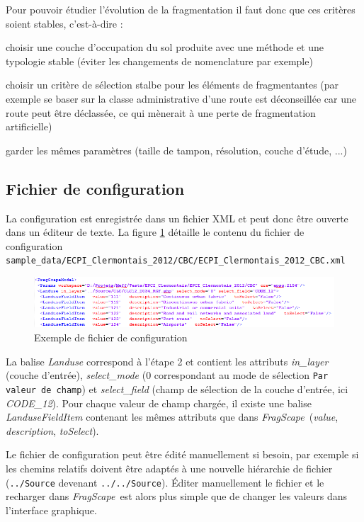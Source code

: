 \documentclass[11pt]{article}
\newcommand{\source}[1]{\vspace*{-0.4cm}\caption*{\textit{Source: {#1}}}}
\newcommand{\tool}{\emph{FragScape}}
\let\tempone\itemize
\let\temptwo\enditemize
\renewenvironment{itemize}{\tempone\addtolength{\itemsep}{-0.5\baselineskip}}{\temptwo}
\begin{document}
Pour pouvoir étudier l'évolution de la fragmentation il faut donc que ces critères soient stables, c'est-à-dire :
\begin{itemize}
    \item choisir une couche d'occupation du sol produite avec une méthode et une typologie stable (éviter les changements de nomenclature par exemple)
    \item choisir un critère de sélection stalbe pour les éléments de fragmentantes (par exemple se baser sur la classe administrative d'une route est déconseillée car une route peut être déclassée, ce qui mènerait à une perte de fragmentation artificielle)
    \item garder les mêmes paramètres (taille de tampon, résolution, couche d'étude, ...)
\end{itemize}

\subsection{Fichier de configuration}

La configuration est enregistrée dans un fichier XML et peut donc être ouverte dans un éditeur de texte. La figure \ref{fig:configFile} détaille le contenu du fichier de configuration \texttt{sample\_data/ECPI\_Clermontais\_2012/CBC/ECPI\_Clermontais\_2012\_CBC.xml}

\begin{figure}[h!]
    \centering
    \includegraphics[scale=0.8]{pictures/configFile.png}
    \caption{Exemple de fichier de configuration}
    \label{fig:configFile}
\end{figure}

La balise \textit{Landuse} correspond à l'étape 2 et contient les attributs \textit{in\_layer} (couche d'entrée), \textit{select\_mode} ($0$ correspondant au mode de sélection \texttt{Par valeur de champ}) et \textit{select\_field} (champ de sélection de la couche d'entrée, ici \textit{CODE\_12}).
Pour chaque valeur de champ chargée, il existe une balise \textit{LanduseFieldItem} contenant les mêmes attributs que dans \tool\ (\textit{value}, \textit{description}, \textit{toSelect}).

Le fichier de configuration peut être édité manuellement si besoin, par exemple si les chemins relatifs doivent être adaptés à une nouvelle hiérarchie de fichier (\texttt{../Source} devenant \texttt{../../Source}). Éditer manuellement le fichier et le recharger dans \tool\ est alors plus simple que de changer les valeurs dans l'interface graphique.
\end{document}
